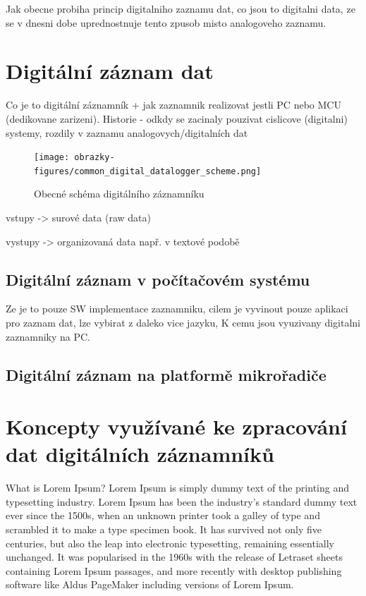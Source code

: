 Jak obecne probiha princip digitalniho zaznamu dat, co jsou to digitalni data, ze se v dnesni dobe uprednostnuje tento zpusob misto analogoveho zaznamu.

\section{Digitální záznam dat}
\label{digitalni_zaznamnik}
Co je to digitální záznamník + jak zaznamnik realizovat jestli PC nebo MCU (dedikovane zarizeni). Historie - odkdy se zacinaly pouzivat cislicove (digitalni) systemy, 
rozdily v zaznamu analogovych/digitalních dat

\begin{figure}[h] %
    \centering
    \texttt{[image: obrazky-figures/common\_digital\_datalogger\_scheme.png]}
    \caption{Obecné schéma digitálního záznamníku}
    \label{fig:polygraaf}
\end{figure}
vstupy -> surové data (raw data)

vystupy -> organizovaná data např. v textové podobě

\subsection{Digitální záznam v počítačovém systému}
Ze je to pouze SW implementace zaznamniku, cilem je vyvinout pouze aplikaci pro zaznam dat, lze vybirat z daleko vice jazyku, K cemu jsou vyuzivany digitalni zaznamniky na PC.

\subsection{Digitální záznam na platformě mikrořadiče}

\section{Koncepty využívané ke zpracování dat digitálních záznamníků}
What is Lorem Ipsum?
Lorem Ipsum is simply dummy text of the printing and typesetting industry. Lorem Ipsum has been the industry's standard dummy text ever since the 1500s, when an unknown 
printer took a galley of type and scrambled it to make a type specimen book. It has survived not only five centuries, but also the leap into electronic typesetting, 
remaining essentially unchanged. It was popularised in the 1960s with the release of Letraset sheets containing Lorem Ipsum passages, and more recently with desktop 
publishing software like Aldus PageMaker including versions of Lorem Ipsum.

